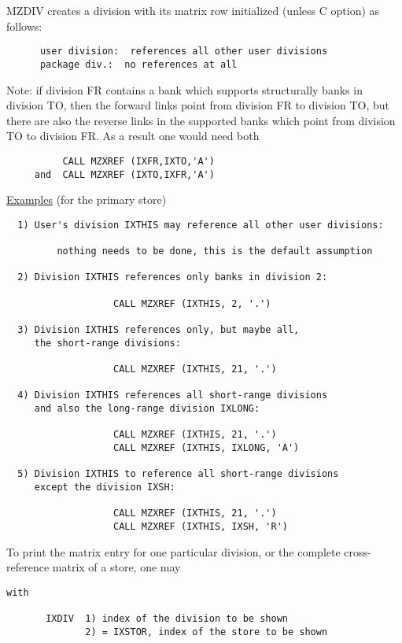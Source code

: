 MZDIV creates a division with its matrix row initialized
(unless C option) as follows:
\begin{verbatim}
      user division:  references all other user divisions
      package div.:  no references at all
\end{verbatim} 

Note: if division FR contains a bank which supports structurally
banks in division TO,
then the forward links point from division FR to division TO,
but there are also the reverse links in the supported banks
which point from division TO to division FR.
As a result one would need both
\begin{verbatim}
          CALL MZXREF (IXFR,IXTO,'A')
     and  CALL MZXREF (IXTO,IXFR,'A')

\end{verbatim} 
\ul{Examples} \hspace*{4mm} (for the primary store)

\begin{verbatim}
  1) User's division IXTHIS may reference all other user divisions:

         nothing needs to be done, this is the default assumption

  2) Division IXTHIS references only banks in division 2:

                   CALL MZXREF (IXTHIS, 2, '.')

  3) Division IXTHIS references only, but maybe all,
     the short-range divisions:

                   CALL MZXREF (IXTHIS, 21, '.')

  4) Division IXTHIS references all short-range divisions
     and also the long-range division IXLONG:

                   CALL MZXREF (IXTHIS, 21, '.')
                   CALL MZXREF (IXTHIS, IXLONG, 'A')

  5) Division IXTHIS to reference all short-range divisions
     except the division IXSH:

                   CALL MZXREF (IXTHIS, 21, '.')
                   CALL MZXREF (IXTHIS, IXSH, 'R')
\end{verbatim} 
\vspace{4mm}
To print the matrix entry for one particular division,
or the complete cross-reference matrix of a store, one may

\begin{verbatim}
with

       IXDIV  1) index of the division to be shown
              2) = IXSTOR, index of the store to be shown
\end{verbatim} 

